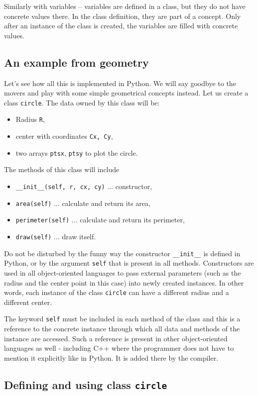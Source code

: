 Similarly with variables -- variables are defined in a class, but they do not 
have concrete values there. In the class definition, they are part of a concept. 
Only after an instance of the class is created, the variables are filled with 
concrete values. 

\subsection{An example from geometry}

Let's see how all this is implemented in Python. We will say goodbye to the movers
and play with some simple geometrical concepts instead. Let us create a class
{\tt circle}. The data owned by this class will be:

\begin{itemize}
\item Radius {\tt R}, 
\item center with coordinates {\tt Cx, Cy}, 
\item two arrays {\tt ptsx}, {\tt ptsy} to plot the circle. 
\end{itemize}
The methods of this class will include 
\begin{itemize}
\item {\tt \_\_init\_\_(self, r, cx, cy)} ... constructor,
\item {\tt area(self)} ... calculate and return its area,
\item {\tt perimeter(self)} ... calculate and return its perimeter,
\item {\tt draw(self)} ... draw itself.
\end{itemize}
Do not be disturbed by the funny way the constructor {\tt \_\_init\_\_} 
is defined in Python, or by the argument {\tt self} that is present 
in all methods. Constructors are 
used in all object-oriented languages to pass external parameters 
(such as the radius and the center point in this case) into newly 
created instances. In other words, each instance of the class {\tt circle} 
can have a different radius and a different center.

The keyword {\tt self} must be included in each method of the class 
and this is a reference to the concrete instance through which all
data and methods of the instance are accessed. Such a reference is present 
in other object-oriented languages as well - including C++ where the programmer
does not have to mention it explicitly like in Python. It is added there by 
the compiler.

\subsection{Defining and using class {\tt circle}} \label{subsec:circle}

